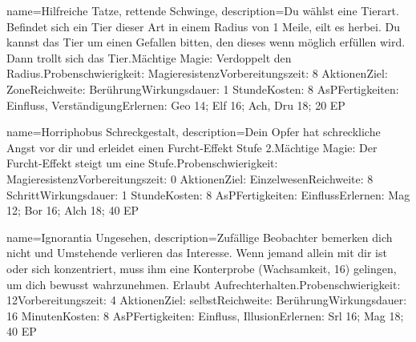 {
    name={Hilfreiche Tatze, rettende Schwinge},
    description={Du wählst eine Tierart. Befindet sich ein Tier dieser Art in einem Radius von 1 Meile, eilt es herbei. Du kannst das Tier um einen Gefallen bitten, den dieses wenn möglich erfüllen wird. Dann trollt sich das Tier.\newline Mächtige Magie: Verdoppelt den Radius.\newline Probenschwierigkeit: Magieresistenz\newline Vorbereitungszeit: 8 Aktionen\newline Ziel: Zone\newline Reichweite: Berührung\newline Wirkungsdauer: 1 Stunde\newline Kosten: 8 AsP\newline Fertigkeiten: Einfluss, Verständigung\newline Erlernen: Geo 14; Elf 16; Ach, Dru 18; 20 EP}
}


{
    name={Horriphobus Schreckgestalt},
    description={Dein Opfer hat schreckliche Angst vor dir und erleidet einen Furcht-Effekt Stufe 2.\newline Mächtige Magie: Der Furcht-Effekt steigt um eine Stufe.\newline Probenschwierigkeit: Magieresistenz\newline Vorbereitungszeit: 0 Aktionen\newline Ziel: Einzelwesen\newline Reichweite: 8 Schritt\newline Wirkungsdauer: 1 Stunde\newline Kosten: 8 AsP\newline Fertigkeiten: Einfluss\newline Erlernen: Mag 12; Bor 16; Alch 18; 40 EP}
}


{
    name={Ignorantia Ungesehen},
    description={Zufällige Beobachter bemerken dich nicht und Umstehende verlieren das Interesse. Wenn jemand allein mit dir ist oder sich konzentriert, muss ihm eine Konterprobe (Wachsamkeit, 16) gelingen, um dich bewusst wahrzunehmen. Erlaubt Aufrechterhalten.\newline Probenschwierigkeit: 12\newline Vorbereitungszeit: 4 Aktionen\newline Ziel: selbst\newline Reichweite: Berührung\newline Wirkungsdauer: 16 Minuten\newline Kosten: 8 AsP\newline Fertigkeiten: Einfluss, Illusion\newline Erlernen: Srl 16; Mag 18; 40 EP}
}


